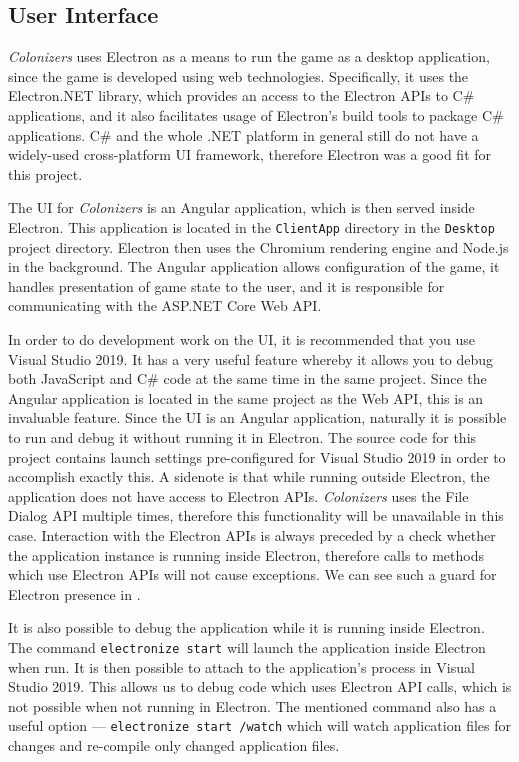 \subsection{User Interface}

\emph{Colonizers} uses Electron as a means to run the game as a desktop application,
since the game is developed using web technologies. Specifically, it uses the
Electron.NET library, which provides an access to the Electron APIs to C\# applications,
and it also facilitates usage of Electron's build tools to package C\# applications.
C\# and the whole .NET platform in general still do not have a widely-used cross-platform
UI framework, therefore Electron was a good fit for this project.

The UI for \emph{Colonizers} is an Angular application, which is then served inside
Electron. This application is located in the \texttt{ClientApp} directory
in the \texttt{Desktop} project directory.
Electron then uses the Chromium rendering engine and Node.js in the background.
The Angular application allows configuration of the game, it handles presentation
of game state to the user, and it is responsible for communicating with the
ASP.NET Core Web API.

In order to do development work on the UI, it is recommended that you use
Visual Studio 2019. It has a very useful feature whereby it allows you to debug
both JavaScript and C\# code at the same time in the same project. Since the Angular
application is located in the same project as the Web API, this is an invaluable
feature. Since the UI is an Angular application, naturally it is possible
to run and debug it without running it in Electron. The source code for this project
contains launch settings pre-configured for Visual Studio 2019 in order to accomplish
exactly this. A sidenote is that while running outside Electron, the application
does not have access to Electron APIs. \emph{Colonizers} uses the File Dialog
API multiple times, therefore this functionality will be unavailable in this case.
Interaction with the Electron APIs is always preceded by a check whether
the application instance is running inside Electron, therefore calls
to methods which use Electron APIs will not cause exceptions. We can see
such a guard for Electron presence in .

It is also possible to debug the application while it is running inside Electron.
The command \texttt{electronize start} will launch the application
inside Electron when run. It is then possible to attach to the application's
process in Visual Studio 2019. This allows us to debug code which uses Electron
API calls, which is not possible when not running in Electron. The mentioned
command also has a useful option --- \texttt{electronize start /watch}
which will watch application files
for changes and re-compile only changed application files.

